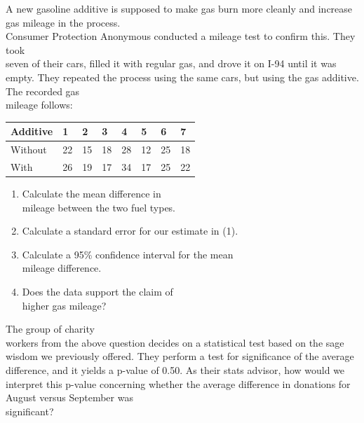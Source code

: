 \documentclass[11pt, chapterprefix=true]{scrbook}\usepackage[]{graphicx}\usepackage[]{color}
\begin{document}
\begin{exercises}
\begin{solution}
\end{solution}

\begin{exercise}  %

A new gasoline additive is supposed to make gas burn more cleanly and increase gas mileage in the process.  \\ Consumer Protection Anonymous conducted a mileage test to confirm this.  They took \\ seven of their cars, filled it with regular gas, and drove it on I-94 until it was empty.  They repeated the process using the same cars, but using the gas additive.  The recorded gas \\ mileage follows:

{\small{
\begin{tabular}{@{} llllllll @{}} \hline
Additive & 1 & 2 & 3 & 4 & 5 & 6 & 7 \\ \hline
Without & 22 & 15 & 18 & 28 & 12 & 25 & 18 \\
With    & 26 & 19 & 17 & 34 & 17 & 25 & 22 \\ \hline
\end{tabular}
}}

\begin{enumerate}
  \item Calculate the mean difference in \\ mileage between the two fuel types.         \item Calculate a standard error for our estimate in (1).
  \item Calculate a 95\% confidence interval for the mean \\ mileage difference.
  \item Does the data support the claim of \\ higher gas mileage?
\end{enumerate}

\end{exercise}
\begin{solution}  %

\end{solution}

\begin{exercise}  %

The group of charity \\ workers from the above question decides on a statistical test based on the sage wisdom we previously offered. They perform a test for significance of the average difference, and it yields a p-value of 0.50. As their stats advisor, how would we interpret this p-value concerning  whether the average difference in donations for August versus September was \\ significant?
\end{exercise}
\begin{solution}  %


\end{solution}
\end{exercises}
\end{document}
